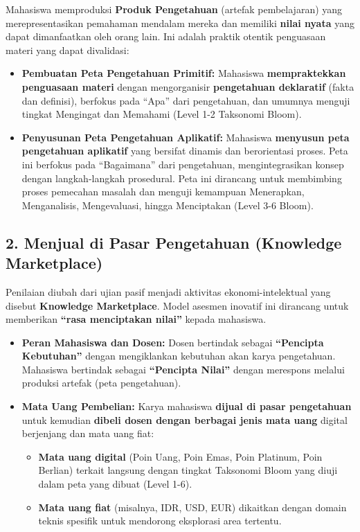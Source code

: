 \documentclass[
  letterpaper,
  DIV=11,
  numbers=noendperiod]{scrreprt}
\providecommand{\tightlist}{%
  \setlength{\itemsep}{0pt}\setlength{\parskip}{0pt}}
\begin{document}
Mahasiswa memproduksi \textbf{Produk Pengetahuan} (artefak pembelajaran)
yang merepresentasikan pemahaman mendalam mereka dan memiliki
\textbf{nilai nyata} yang dapat dimanfaatkan oleh orang lain. Ini adalah
praktik otentik penguasaan materi yang dapat divalidasi:

\begin{itemize}
\tightlist
\item
  \textbf{Pembuatan Peta Pengetahuan Primitif:} Mahasiswa
  \textbf{mempraktekkan penguasaan materi} dengan mengorganisir
  \textbf{pengetahuan deklaratif} (fakta dan definisi), berfokus pada
  ``Apa'' dari pengetahuan, dan umumnya menguji tingkat Mengingat dan
  Memahami (Level 1-2 Taksonomi Bloom).
\item
  \textbf{Penyusunan Peta Pengetahuan Aplikatif:} Mahasiswa
  \textbf{menyusun peta pengetahuan aplikatif} yang bersifat dinamis dan
  berorientasi proses. Peta ini berfokus pada ``Bagaimana'' dari
  pengetahuan, mengintegrasikan konsep dengan langkah-langkah
  prosedural. Peta ini dirancang untuk membimbing proses pemecahan
  masalah dan menguji kemampuan Menerapkan, Menganalisis, Mengevaluasi,
  hingga Menciptakan (Level 3-6 Bloom).
\end{itemize}

\subsection{2. Menjual di Pasar Pengetahuan (Knowledge
Marketplace)}\label{menjual-di-pasar-pengetahuan-knowledge-marketplace}

Penilaian diubah dari ujian pasif menjadi aktivitas ekonomi-intelektual
yang disebut \textbf{Knowledge Marketplace}. Model asesmen inovatif ini
dirancang untuk memberikan \textbf{``rasa menciptakan nilai''} kepada
mahasiswa.

\begin{itemize}
\tightlist
\item
  \textbf{Peran Mahasiswa dan Dosen:} Dosen bertindak sebagai
  \textbf{``Pencipta Kebutuhan''} dengan mengiklankan kebutuhan akan
  karya pengetahuan. Mahasiswa bertindak sebagai \textbf{``Pencipta
  Nilai''} dengan merespons melalui produksi artefak (peta pengetahuan).
\item
  \textbf{Mata Uang Pembelian:} Karya mahasiswa \textbf{dijual di pasar
  pengetahuan} untuk kemudian \textbf{dibeli dosen dengan berbagai jenis
  mata uang} digital berjenjang dan mata uang fiat:

  \begin{itemize}
  \tightlist
  \item
    \textbf{Mata uang digital} (Poin Uang, Poin Emas, Poin Platinum,
    Poin Berlian) terkait langsung dengan tingkat Taksonomi Bloom yang
    diuji dalam peta yang dibuat (Level 1-6).
  \item
    \textbf{Mata uang fiat} (misalnya, IDR, USD, EUR) dikaitkan dengan
    domain teknis spesifik untuk mendorong eksplorasi area tertentu.
  \end{itemize}
\end{itemize}
\end{document}
